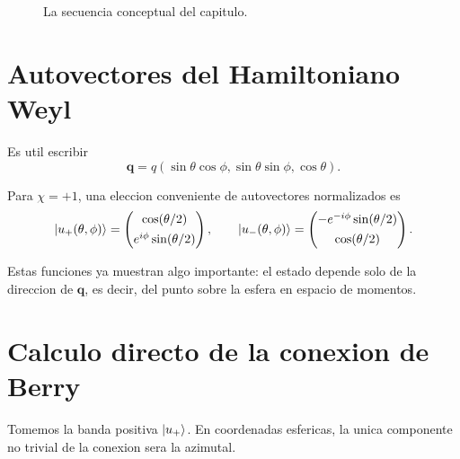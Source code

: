 \begin{figure}[h!]
\centering
{}
\caption{La secuencia conceptual del capitulo.}
\end{figure}

\section{Autovectores del Hamiltoniano Weyl}
Es util escribir
\begin{equation}
\bm{q} = q(\sin\theta\cos\phi,\sin\theta\sin\phi,\cos\theta).
\end{equation}

Para \(\chi=+1\), una eleccion conveniente de autovectores normalizados es
\begin{equation}
\ket{u_+(\theta,\phi)}=
\begin{pmatrix}
\cos(\theta/2)\\[0.4em]
e^{i\phi}\sin(\theta/2)
\end{pmatrix},
\qquad
\ket{u_-(\theta,\phi)}=
\begin{pmatrix}
-e^{-i\phi}\sin(\theta/2)\\[0.4em]
\cos(\theta/2)
\end{pmatrix}.
\label{c10:eq:eigenstates}
\end{equation}

Estas funciones ya muestran algo importante: el estado depende solo de la direccion de \(\bm{q}\), es decir, del punto sobre la esfera en espacio de momentos.

\section{Calculo directo de la conexion de Berry}
Tomemos la banda positiva \(\ket{u_+}\). En coordenadas esfericas, la unica componente no trivial de la conexion sera la azimutal.

